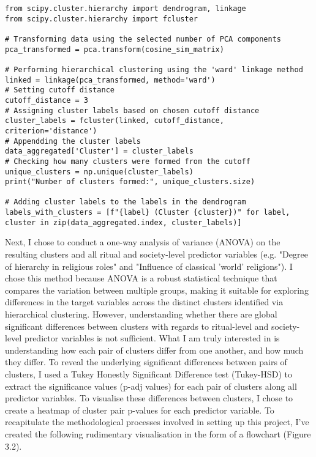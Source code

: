 \documentclass[12pt]{report}
\begin{document}
	\begin{lstlisting}
from scipy.cluster.hierarchy import dendrogram, linkage
from scipy.cluster.hierarchy import fcluster

# Transforming data using the selected number of PCA components
pca_transformed = pca.transform(cosine_sim_matrix)

# Performing hierarchical clustering using the 'ward' linkage method
linked = linkage(pca_transformed, method='ward')
# Setting cutoff distance
cutoff_distance = 3
# Assigning cluster labels based on chosen cutoff distance
cluster_labels = fcluster(linked, cutoff_distance, criterion='distance')
# Appendding the cluster labels
data_aggregated['Cluster'] = cluster_labels
# Checking how many clusters were formed from the cutoff
unique_clusters = np.unique(cluster_labels)
print("Number of clusters formed:", unique_clusters.size)

# Adding cluster labels to the labels in the dendrogram
labels_with_clusters = [f"{label} (Cluster {cluster})" for label, cluster in zip(data_aggregated.index, cluster_labels)]
\end{lstlisting}
\vspace{0.5cm}
\noindent Next, I chose to conduct a one-way analysis of variance (ANOVA) on the resulting clusters and all ritual and society-level predictor variables (e.g. "Degree of hierarchy in religious roles" and "Influence of classical 'world' religions"). I chose this method because ANOVA is a robust statistical technique that compares the variation between multiple groups, making it suitable for exploring differences in the target variables across the distinct clusters identified via hierarchical clustering. However, understanding whether there are global significant differences between clusters with regards to ritual-level and society-level predictor variables is not sufficient. What I am truly interested in is understanding how each pair of clusters differ from one another, and how much they differ. To reveal the underlying significant differences between pairs of clusters, I used a Tukey Honestly Significant Difference test (Tukey-HSD) to extract the significance values (p-adj values) for each pair of clusters along all predictor variables. To visualise these differences between clusters, I chose to create a heatmap of cluster pair p-values for each predictor variable. To recapitulate the methodological processes involved in setting up this project, I’ve created the following rudimentary visualisation in the form of a flowchart (Figure 3.2). 
\end{document}
